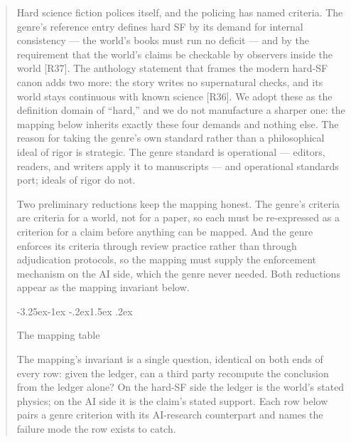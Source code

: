 \documentclass[11pt,a4paper]{article}
\makeatletter
\renewcommand\subsection{\@startsection{subsection}{2}{\z@}%
  {-3.25ex\@plus -1ex \@minus -.2ex}{1.5ex \@plus .2ex}%
  {\normalfont\large\bfseries\raggedright}}
\makeatother
\begin{document}
\begin{abstract}
Hard science fiction polices itself, and the policing has named criteria. The genre's reference entry defines hard SF by its demand for internal consistency — the world's books must run no deficit — and by the requirement that the world's claims be checkable by observers inside the world [R37]. The anthology statement that frames the modern hard-SF canon adds two more: the story writes no supernatural checks, and its world stays continuous with known science [R36]. We adopt these as the definition domain of ``hard,'' and we do not manufacture a sharper one: the mapping below inherits exactly these four demands and nothing else. The reason for taking the genre's own standard rather than a philosophical ideal of rigor is strategic. The genre standard is operational — editors, readers, and writers apply it to manuscripts — and operational standards port; ideals of rigor do not.

Two preliminary reductions keep the mapping honest. The genre's criteria are criteria for a world, not for a paper, so each must be re-expressed as a criterion for a claim before anything can be mapped. And the genre enforces its criteria through review practice rather than through adjudication protocols, so the mapping must supply the enforcement mechanism on the AI side, which the genre never needed. Both reductions appear as the mapping invariant below.

\subsection{The mapping table}

The mapping's invariant is a single question, identical on both ends of every row: given the ledger, can a third party recompute the conclusion from the ledger alone? On the hard-SF side the ledger is the world's stated physics; on the AI side it is the claim's stated support. Each row below pairs a genre criterion with its AI-research counterpart and names the failure mode the row exists to catch.


\end{abstract}
\end{document}
